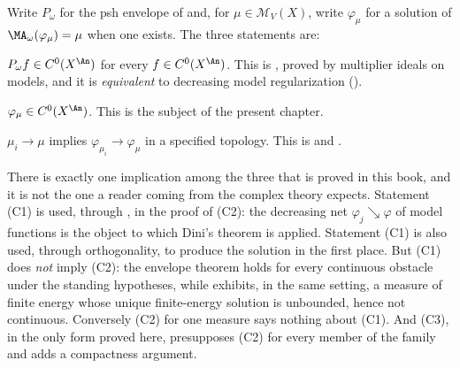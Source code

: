 Write \(P_\omega\) for the psh envelope of  and, for
\(\mu\in\mathcal M_V(X)\), write \(\varphi_\mu\) for a solution of
\(\MA_\omega(\varphi_\mu)=\mu\) when one exists.  The three statements are:

\begin{description}[style=nextline,leftmargin=1.5em,itemsep=.4\baselineskip]
\item[(C1) Continuity of envelopes.]
\(P_\omega f\in C^0(X^{\An})\) for every \(f\in C^0(X^{\An})\).  This is
, proved by multiplier ideals on models,
and it is \emph{equivalent} to decreasing model regularization
().
\item[(C2) Continuity of solutions.]
\(\varphi_\mu\in C^0(X^{\An})\).  This is the subject of the present
chapter.
\item[(C3) Continuity of the solution map.]
\(\mu_i\to\mu\) implies \(\varphi_{\mu_i}\to\varphi_\mu\) in a specified
topology.  This is  and
.
\end{description}

There is exactly one implication among the three that is proved in this
book, and it is not the one a reader coming from the complex theory
expects.  Statement (C1) is used, through
, in the proof of (C2): the
decreasing net \(\varphi_j\searrow\varphi\) of model functions is the object
to which Dini's theorem is applied.  Statement (C1) is also used, through
orthogonality, to produce the solution in the first place.  But (C1) does
\emph{not} imply (C2): the envelope theorem holds for every continuous
obstacle under the standing hypotheses, while
 exhibits, in the same setting, a
measure of finite energy whose unique finite-energy solution is unbounded,
hence not continuous.  Conversely (C2) for one measure says nothing about
(C1).  And (C3), in the only form proved here, presupposes (C2) for every
member of the family and adds a compactness argument.

